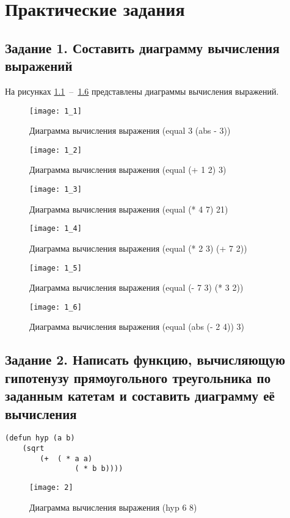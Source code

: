 \chapter{Практические задания}

\section{Задание 1. Составить диаграмму вычисления выражений}

На рисунках \ref{1_1}~--~\ref{1_6} представлены диаграммы вычисления выражений.

\begin{figure}[H]
	\centering
	\texttt{[image: 1\_1]}
	\caption{Диаграмма вычисления выражения (equal 3 (abs - 3))}
	\label{1_1}
\end{figure}
\begin{figure}[H]
	\centering
	\texttt{[image: 1\_2]}
	\caption{Диаграмма вычисления выражения (equal (+ 1 2) 3)}
	\label{1_2}
\end{figure}
\begin{figure}[H]
	\centering
	\texttt{[image: 1\_3]}
	\caption{Диаграмма вычисления выражения (equal (* 4 7) 21)}
	\label{1_3}
\end{figure}
\begin{figure}[H]
	\centering
	\texttt{[image: 1\_4]}
	\caption{Диаграмма вычисления выражения (equal (* 2 3) (+ 7 2))}
	\label{1_4}
\end{figure}
\begin{figure}[H]
	\centering
	\texttt{[image: 1\_5]}
	\caption{Диаграмма вычисления выражения (equal (- 7 3) (* 3 2))}
	\label{1_5}
\end{figure}
\begin{figure}[H]
	\centering
	\texttt{[image: 1\_6]}
	\caption{Диаграмма вычисления выражения (equal (abs (- 2 4)) 3)}
	\label{1_6}
\end{figure}

\clearpage

\section{Задание 2. Написать функцию, вычисляющую гипотенузу прямоугольного треугольника по заданным катетам и составить диаграмму её вычисления}

\begin{lstlisting}
(defun hyp (a b)
	(sqrt 
		(+  ( * a a)
				( * b b))))
\end{lstlisting}
\begin{figure}[H]
	\centering
	\texttt{[image: 2]}
	\caption{Диаграмма вычисления выражения (hyp 6 8)}
	\label{2}
\end{figure}

